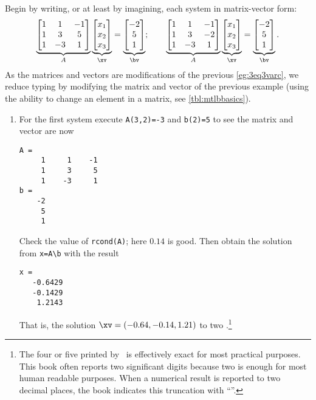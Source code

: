 \begin{example}
\begin{solution} 
Begin by writing, or at least by imagining, each system in matrix-vector form:
\begin{equation*}
\underbrace{\begin{bmatrix} 1&1&-1\\ 1&3&5\\1&-3&1 \end{bmatrix}}_A
\underbrace{\begin{bmatrix} x_1\\x_2\\x_3 \end{bmatrix}}_\xv
=\underbrace{\begin{bmatrix} -2\\5\\1 \end{bmatrix}}_\bv ;
\qquad
\underbrace{\begin{bmatrix} 1&1&-1\\ 1&3&-2\\1&-3&1 \end{bmatrix}}_A
\underbrace{\begin{bmatrix} x_1\\x_2\\x_3 \end{bmatrix}}_\xv
=\underbrace{\begin{bmatrix} -2\\5\\1 \end{bmatrix}}_\bv .
\end{equation*}
As the matrices and vectors are modifications of the previous \cref{eg:3eq3varc}, we reduce typing by modifying the matrix and vector of the previous example (using the ability to change an element in a matrix, see \cref{tbl:mtlbbasics}).
\begin{enumerate}
\item For the first system execute \verb|A(3,2)=-3| and \verb|b(2)=5|
to see the matrix and vector are now
\begin{verbatim}
A =
     1     1    -1
     1     3     5
     1    -3     1
b =
    -2
     5
     1
\end{verbatim}
Check the value of \verb|rcond(A)|; here \(0.14\) is good.
Then obtain the solution from \verb|x=A\b| with the result
\begin{verbatim}
x =
   -0.6429
   -0.1429
    1.2143
\end{verbatim}
That is, the solution \(\xv=(-0.64,-0.14,1.21)\) to two  \twodp.\footnote{The four or five  printed by \script\ is effectively exact for most practical purposes.
This book often reports two significant digits because two is enough for most human readable purposes.
When a numerical result is reported to two decimal places, the book indicates this truncation with ``\twodp''.}


\end{enumerate}
\end{solution}
\end{example}
